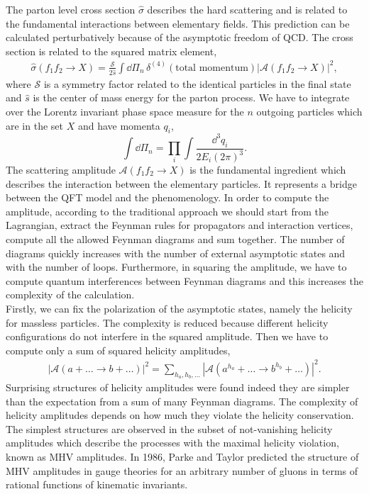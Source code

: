 The parton level cross section $\hat \sigma$ describes the hard scattering and is related to the fundamental interactions between elementary fields. This prediction can be calculated perturbatively because of the asymptotic freedom of QCD. The cross section is related to the squared matrix element,
\begin{align*}
	\hat \sigma(f_1 f_2 \rightarrow X)=\frac{\mathcal{S}}{2 \hat s} \int \dd \Pi_n \, \delta^{(4)}\left(\text{total momentum}\right) \left| \mathcal{A}(f_1 f_2 \rightarrow X)\right|^2,
\end{align*}
where $\mathcal{S}$ is a symmetry factor related to the identical particles in the final state and $\hat s$ is the center of mass energy for the parton process. We have to integrate over the Lorentz invariant phase space measure for the $n$ outgoing particles which are in the set $X$ and have momenta $q_i$,
$$
	\int \dd \Pi_n = \prod_i \int \frac{\dd^3 q_i}{2E_i (2\pi)^3}.
$$
The scattering amplitude $\mathcal{A}(f_1 f_2 \rightarrow X)$ is the fundamental ingredient which describes the interaction between the elementary particles. It represents a bridge between the QFT model and the phenomenology. In order to compute the amplitude, according to the traditional approach we should start from the Lagrangian, extract the Feynman rules for propagators and interaction vertices, compute all the allowed Feynman diagrams and sum together. The number of diagrams quickly increases with the number of external asymptotic states and with the number of loops. Furthermore, in squaring the amplitude, we have to compute quantum interferences between Feynman diagrams and this increases the complexity of the calculation.\\
Firstly, we can fix the polarization of the asymptotic states, namely the helicity for massless particles. The complexity is reduced because different helicity configurations do not interfere in the squared amplitude. Then we have to compute only a sum of squared helicity amplitudes,
\begin{align*}
	\left| \mathcal{A}(a+\dots \rightarrow b+\dots)\right|^2= \sum_{h_a, h_b, \dots} | \mathcal{A}(a^{h_a} +\dots \rightarrow b^{h_b} +\dots)|^2.
\end{align*}
Surprising structures of helicity amplitudes were found indeed they are simpler than the expectation from a sum of many Feynman diagrams. The complexity of helicity amplitudes depends on how much they violate the helicity conservation. The simplest structures are observed in the subset of not-vanishing helicity amplitudes which describe the processes with the maximal helicity violation, known as MHV amplitudes. In 1986, Parke and Taylor \cite{Parke:1986gb} predicted the structure of MHV amplitudes in gauge theories for an arbitrary number of gluons in terms of rational functions of kinematic invariants.\\
